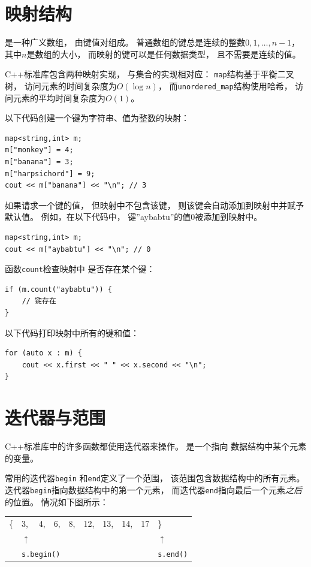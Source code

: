 \section{映射结构}


是一种广义数组，
由键值对组成。
普通数组的键总是连续的整数$0,1,\ldots,n-1$，
其中$n$是数组的大小，
而映射的键可以是任何数据类型，
且不需要是连续的值。

C++标准库包含两种映射实现，
与集合的实现相对应：
\texttt{map}结构基于平衡二叉树，
访问元素的时间复杂度为$O(\log n)$，
而\texttt{unordered\_map}结构使用哈希，
访问元素的平均时间复杂度为$O(1)$。

以下代码创建一个键为字符串、值为整数的映射：

\begin{lstlisting}
map<string,int> m;
m["monkey"] = 4;
m["banana"] = 3;
m["harpsichord"] = 9;
cout << m["banana"] << "\n"; // 3
\end{lstlisting}

如果请求一个键的值，
但映射中不包含该键，
则该键会自动添加到映射中并赋予默认值。
例如，在以下代码中，
键''aybabtu''的值0被添加到映射中。

\begin{lstlisting}
map<string,int> m;
cout << m["aybabtu"] << "\n"; // 0
\end{lstlisting}
函数\texttt{count}检查映射中
是否存在某个键：
\begin{lstlisting}
if (m.count("aybabtu")) {
    // 键存在
}
\end{lstlisting}
以下代码打印映射中所有的键和值：
\begin{lstlisting}
for (auto x : m) {
    cout << x.first << " " << x.second << "\n";
}
\end{lstlisting}

\section{迭代器与范围}


C++标准库中的许多函数都使用迭代器来操作。
是一个指向
数据结构中某个元素的变量。

常用的迭代器\texttt{begin}
和\texttt{end}定义了一个范围，
该范围包含数据结构中的所有元素。
迭代器\texttt{begin}指向数据结构中的第一个元素，
而迭代器\texttt{end}指向最后一个元素\emph{之后}的位置。
情况如下图所示：

\begin{center}
\begin{tabular}{llllllllll}
\{ & 3, & 4, & 6, & 8, & 12, & 13, & 14, & 17 & \} \\
& $\uparrow$ & & & & & & & & $\uparrow$ \\
& \multicolumn{3}{l}{\texttt{s.begin()}} & & & & & & \texttt{s.end()} \\
\end{tabular}
\end{center}

